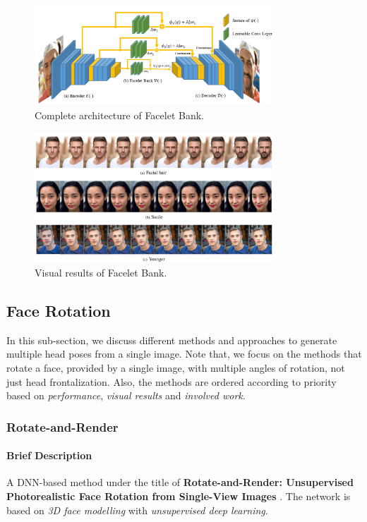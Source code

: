 \begin{figure}[H]
    \centering
    \includegraphics[width=0.8\textwidth]{images/facelet.png}
    \caption{Complete architecture of Facelet Bank.}
    \label{fig:facelet}
\end{figure}

\begin{figure}[H]
    \centering
    \includegraphics[width=0.8\textwidth]{images/facelet-results.png}
    \caption{Visual results of Facelet Bank.}
    \label{fig:facelet_res}
\end{figure}

\subsection{Face Rotation}
In this sub-section, we discuss different methods and approaches to generate multiple head poses from a single image. Note that, we focus on the methods that rotate a face, provided by a single image, with multiple angles of rotation, not just head frontalization. Also, the methods are ordered according to priority based on \emph{performance}, \emph{visual results} and \emph{involved work}.

\subsubsection{Rotate-and-Render}

\paragraph{Brief Description}
A DNN-based method under the title of \textbf{Rotate-and-Render: Unsupervised Photorealistic Face Rotation from Single-View Images} \cite{zhou2020rotateandrender}. The network is based on \emph{3D face modelling} with \emph{unsupervised deep learning}. 

